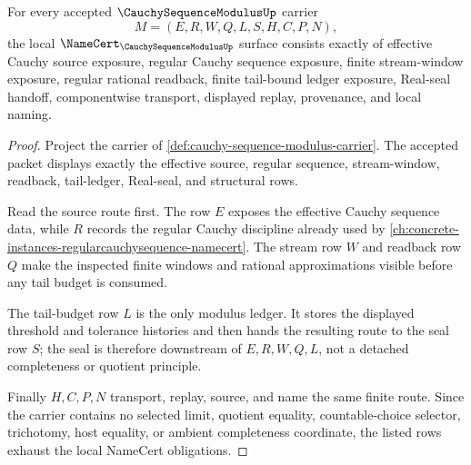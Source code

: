 \begin{theorem}
\label{thm:cauchy-sequence-modulus-namecert-obligations}
For every accepted $\CauchySequenceModulusUp$ carrier
$$
M=(E,R,W,Q,L,S,H,C,P,N),
$$
the local $\NameCert_{\CauchySequenceModulusUp}$ surface consists exactly of effective Cauchy source exposure, regular Cauchy sequence exposure, finite stream-window exposure, regular rational readback, finite tail-bound ledger exposure, Real-seal handoff, componentwise transport, displayed replay, provenance, and local naming.
\end{theorem}
\begin{proof}
Project the carrier of \autoref{def:cauchy-sequence-modulus-carrier}. The accepted packet displays exactly the effective source, regular sequence, stream-window, readback, tail-ledger, Real-seal, and structural rows.

Read the source route first. The row $E$ exposes the effective Cauchy sequence data, while $R$ records the regular Cauchy discipline already used by \autoref{ch:concrete-instances-regularcauchysequence-namecert}. The stream row $W$ and readback row $Q$ make the inspected finite windows and rational approximations visible before any tail budget is consumed.

The tail-budget row $L$ is the only modulus ledger. It stores the displayed threshold and tolerance histories and then hands the resulting route to the seal row $S$; the seal is therefore downstream of $E,R,W,Q,L$, not a detached completeness or quotient principle.

Finally $H,C,P,N$ transport, replay, source, and name the same finite route. Since the carrier contains no selected limit, quotient equality, countable-choice selector, trichotomy, host equality, or ambient completeness coordinate, the listed rows exhaust the local NameCert obligations.
\end{proof}


